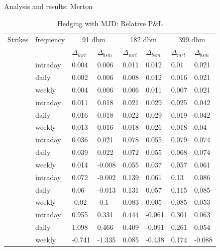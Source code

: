 \documentclass{beamer}
\begin{document}
\begin{frame}{Analysis and results: Merton}

\begin{table}[h]
\small
\centering
\begin{tabular}{llllllll}
  \hline
  \hline
 Strikes & frequency  &\multicolumn{2}{c}{91 dbm} & \multicolumn{2}{c}{182 dbm} & \multicolumn{2}{c}{399 dbm} \\ 
   &  & $\Delta_{mrt}$ & $\Delta_{bsm}$ & $\Delta_{mrt}$ & $\Delta_{bsm}$ & $\Delta_{mrt}$ & $\Delta_{bsm}$ \\ 
   \hdashline
  \multirow{3}{*}{140} & intraday & 0.004 & 0.006 & 0.011 & 0.012 & 0.01 & 0.021 \\ 
  & daily & 0.002 & 0.006 & 0.008 & 0.012 & 0.016 & 0.021 \\ 
  & weekly & 0.004 & 0.006 & 0.006 & 0.011 & 0.007 & 0.021 \\ 
   \hdashline
  \multirow{3}{*}{160} & intraday & 0.011 & 0.018 & 0.021 & 0.029 & 0.025 & 0.042 \\ 
  & daily & 0.016 & 0.018 & 0.022 & 0.029 & 0.019 & 0.042 \\ 
  & weekly & 0.013 & 0.016 & 0.018 & 0.026 & 0.018 & 0.04 \\ 
   \hdashline
  \multirow{3}{*}{186} & intraday & 0.036 & 0.021 & 0.078 & 0.055 & 0.079 & 0.074 \\ 
  & daily & 0.039 & 0.022 & 0.072 & 0.055 & 0.068 & 0.074 \\ 
  & weekly & 0.014 & -0.008 & 0.055 & 0.037 & 0.057 & 0.061 \\ 
   \hdashline
  \multirow{3}{*}{200} & intraday & 0.072 & -0.002 & 0.139 & 0.061 & 0.13 & 0.086 \\ 
  & daily & 0.06 & -0.013 & 0.131 & 0.057 & 0.115 & 0.085 \\ 
  & weekly & -0.02 & -0.1 & 0.083 & 0.005 & 0.085 & 0.053 \\ 
   \hdashline
  \multirow{3}{*}{230} & intraday & 0.955 & 0.331 & 0.444 & -0.061 & 0.301 & 0.063 \\ 
  & daily & 1.098 & 0.466 & 0.409 & -0.091 & 0.261 & 0.054 \\ 
  & weekly & -0.741 & -1.335 & 0.085 & -0.438 & 0.174 & -0.088 \\ 
   \hline
\end{tabular}
\caption{Hedging with MJD: Relative P\&L} 
\label{t:analysis:merton:pl}
\end{table}
 
\end{frame}
\end{document}
